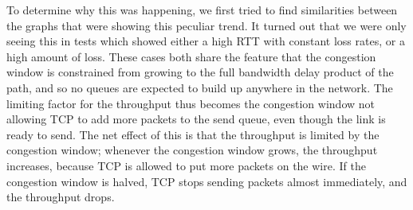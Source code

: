 To determine why this was happening, we first tried to find similarities between
the graphs that were showing this peculiar trend. It turned out that we were
only seeing this in tests which showed either a high RTT with constant loss
rates, or a high amount of loss. These cases both share the feature that the
congestion window is constrained from growing to the full bandwidth delay
product of the path, and so no queues are expected to build up anywhere in the
network. The limiting factor for the throughput thus becomes the congestion
window not allowing TCP to add more packets to the send queue, even though the
link is ready to send. The net effect of this is that the throughput is limited
by the congestion window; whenever the congestion window grows, the throughput
increases, because TCP is allowed to put more packets on the wire. If the
congestion window is halved, TCP stops sending packets almost immediately, and
the throughput drops.
